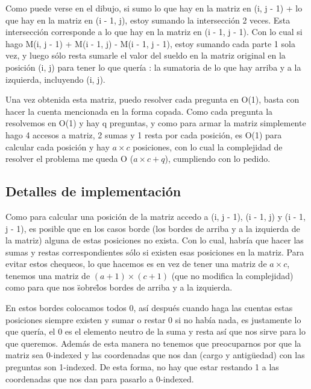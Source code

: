 Como puede verse en el dibujo, si sumo lo que hay en la matriz en (i, j - 1) + lo que hay en la matriz en (i - 1, j), estoy sumando la intersección 2 veces. Esta intersección corresponde a lo que hay en la matriz en (i - 1, j - 1). Con lo cual si hago M(i, j - 1) + M(i - 1, j) - M(i - 1, j - 1), estoy sumando cada parte 1 sola vez, y luego sólo resta sumarle el valor del sueldo en la matriz original en la posición (i, j) para tener lo que quería : la sumatoria de lo que hay arriba y a la izquierda, incluyendo (i, j). \newline

Una vez obtenida esta matriz, puedo resolver cada pregunta en O(1), basta con hacer la cuenta mencionada en la forma copada. Como cada pregunta la resolvemos en O(1) y hay q preguntas, y como para armar la matriz simplemente hago 4 accesos a matriz, 2 sumas y 1 resta por cada posición, es O(1) para calcular cada posición y hay $a \times c$ posiciones, con lo cual la complejidad de resolver el problema me queda O ($a \times c + q$), cumpliendo con lo pedido.

\subsection {Detalles de implementación}

Como para calcular una posición de la matriz accedo a (i, j - 1),  (i - 1, j) y (i - 1, j - 1), es posible que en los casos borde (los bordes de arriba y a la izquierda de la matriz) alguna de estas posiciones no exista. Con lo cual, habría que hacer las sumas y restas correspondientes sólo si existen esas posiciones en la matriz. Para evitar estos chequeos, lo que hacemos es en vez de tener una matriz de $a \times c$, tenemos una matriz de $(a + 1) \times (c + 1)$ (que no modifica la complejidad) como para que nos \"sobre\" los bordes de arriba y a la izquierda. \newline

En estos bordes colocamos todos 0, así después cuando haga las cuentas estas posiciones siempre existen y sumar o restar 0 si no había nada, es justamente lo que quería, el 0 es el elemento neutro de la suma y resta así que nos sirve para lo que queremos. Además de esta manera no tenemos que preocuparnos por que la matriz sea 0-indexed y las coordenadas que nos dan (cargo y antigüedad) con las preguntas son 1-indexed. De esta forma, no hay que estar restando 1 a las coordenadas que nos dan para pasarlo a 0-indexed.\newline

